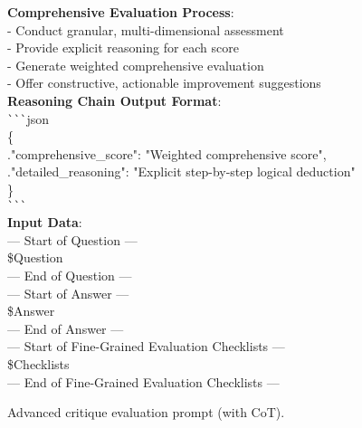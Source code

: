 \documentclass[11pt, a4paper, logo, copyright, nonumbering, amsart]{map}
\begin{document}
\begin{CJK*}{UTF8}{gbsn}
\begin{figure*}[h!]
\begin{center}
\begin{tcolorbox}[width=0.8\textwidth, colback=lightblue, title={\textbf{Advanced Critique Evaluation Prompt (with CoT)}}]
    \textbf{Comprehensive Evaluation Process}:\\
    - Conduct granular, multi-dimensional assessment\\
    - Provide explicit reasoning for each score\\
    - Generate weighted comprehensive evaluation\\
    - Offer constructive, actionable improvement suggestions\\
    
    \textbf{Reasoning Chain Output Format}:\\
    \verb|```|json\\
    \{\\
        .\quad"comprehensive\_score": "Weighted comprehensive score",\\
        .\quad"detailed\_reasoning": "Explicit step-by-step logical deduction"\\
    \}\\
    \verb|```|\\
    
    \textbf{Input Data}:\\
    --- Start of Question ---\\
    \textcolor{ora}{\$Question}\\
    --- End of Question ---\\
    
    --- Start of Answer ---\\
    \textcolor{ora}{\$Answer}\\
    --- End of Answer ---\\
    
    --- Start of Fine-Grained Evaluation Checklists ---\\ 
    \textcolor{ora}{\$Checklists}\\
    --- End of Fine-Grained Evaluation Checklists ---\\

    \end{tcolorbox}
\end{center}
\caption{Advanced critique evaluation prompt (with CoT).} \label{ap:prompt_cot_level2}
\end{figure*}

\begin{figure*}[h!]
\begin{center}
    \fontsize{8.4}{8.4} \selectfont
    \begin{tcolorbox}[width=0.6\textwidth, colback=lightblue, title={\textbf{Prompt for Refining Origin Answer Based on Model's Critiques}}]


\end{tcolorbox}
\end{center}
\end{figure*}
\end{CJK*}
\end{document}
